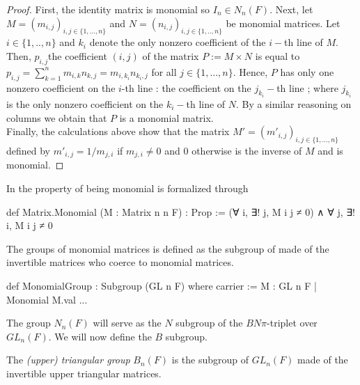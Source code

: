 \begin{proof}
    First, the identity matrix is monomial so $I_n \in N_n(F)$. Next, let $M = \left( m_{i,j} \right)_{i,j \in \{1,\ldots,n\}}$ and $N =\left( n_{i,j} \right)_{i,j \in \{1,..,n\}}$ be monomial matrices. Let $i \in \{1,..,n\}$ and $k_i$ denote the only nonzero coefficient of the $i-$th line of $M$. Then, $p_{i,j}$the coefficient $(i,j)$ of the matrix $P:= M \times N$ is equal to $p_{i,j} = \sum_{k=1}^{n} m_{i,k}n_{k,j} = m_{i,k_i}n_{k_i, j}$ for all $j \in \{1,\ldots,n\}$. Hence, $P$ has only one nonzero coefficient on the $i$-th line : the coefficient on the $j_{k_i}-$th line ; where $j_{k_i}$ is the only nonzero coefficient on the $k_i-$th line of $N$. By a similar reasoning on columns we obtain that $P$ is a monomial matrix.\\
    Finally, the calculations above show that the matrix $M' = \left( m'_{i,j} \right)_{i,j \in \{1,\ldots,n\}}$ defined by $m'_{i,j} = 1 /{m_{j,i}}$ if $m_{j,i} \neq 0$ and $0$ otherwise is the inverse of $M$ and is monomial.
\end{proof}

\begin{implementation}
    In \Lean the property of being monomial is formalized through
    \begin{leancode}
def Matrix.Monomial (M : Matrix n n F) : Prop := 
    (∀ i, ∃! j, M i j ≠ 0) ∧ ∀ j, ∃! i, M i j ≠ 0
    \end{leancode}
    The groups of monomial matrices is defined as the subgroup of  made of the invertible matrices who coerce to monomial matrices.
    \begin{leancode}
def MonomialGroup : Subgroup (GL n F) where
  carrier := {M : GL n F | Monomial M.val}
    ...
\end{leancode}

\begin{comment}
    In the above code, the term \lean{M.val : Matrix n n F} designates the underlying matrix of the invertible matrix \lean{M : GL n F}.
\end{comment}
\end{implementation}

The group $N_n\left( F \right)$ will serve as the $N$ subgroup of the $BN\pi$-triplet over $GL_n(F)$. We will now define the $B$ subgroup.

\begin{definition}
    The \emph{(upper) triangular group} $B_n\left( F \right)$ is the subgroup of $GL_n\left( F \right)$ made of the invertible upper triangular matrices.
\end{definition}


